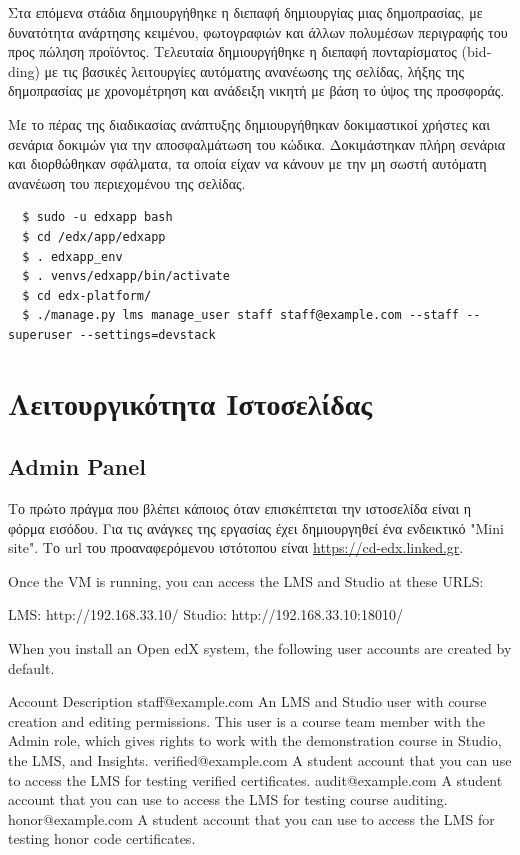 \documentclass[12pt]{report}
\begin{document}
Στα επόμενα στάδια δημιουργήθηκε η διεπαφή δημιουργίας μιας δημοπρασίας, με δυνατότητα ανάρτησης κειμένου, φωτογραφιών και άλλων πολυμέσων περιγραφής του προς πώληση προϊόντος. Τελευταία δημιουργήθηκε η διεπαφή πονταρίσματος (\textlatin{bidding}) με τις βασικές λειτουργίες αυτόματης ανανέωσης της σελίδας, λήξης της δημοπρασίας με χρονομέτρηση και ανάδειξη νικητή με βάση το ύψος της προσφοράς.

Με το πέρας της διαδικασίας ανάπτυξης δημιουργήθηκαν δοκιμαστικοί χρήστες και σενάρια δοκιμών για την αποσφαλμάτωση του κώδικα. Δοκιμάστηκαν πλήρη σενάρια και διορθώθηκαν σφάλματα, τα οποία είχαν να κάνουν με την μη σωστή αυτόματη ανανέωση του περιεχομένου της σελίδας.
\begin{Verbatim}
  $ sudo -u edxapp bash
  $ cd /edx/app/edxapp
  $ . edxapp_env
  $ . venvs/edxapp/bin/activate
  $ cd edx-platform/
  $ ./manage.py lms manage_user staff staff@example.com --staff --superuser --settings=devstack
\end{Verbatim}

\section{Λειτουργικότητα Ιστοσελίδας}
\subsection{\textlatin{Admin Panel}}
Το πρώτο πράγμα που βλέπει κάποιος όταν επισκέπτεται την ιστοσελίδα είναι η φόρμα εισόδου. Για τις ανάγκες της εργασίας έχει δημιουργηθεί ένα ενδεικτικό \textlatin{"Mini site"}. Το \textlatin{url} του προαναφερόμενου ιστότοπου είναι \textlatin{\url{https://cd-edx.linked.gr}}.

Once the VM is running, you can access the LMS and Studio at these URLS:

    LMS: http://192.168.33.10/
    Studio: http://192.168.33.10:18010/

When you install an Open edX system, the following user accounts are created by default.

    Account             Description
    staff@example.com   An LMS and Studio user with course creation and editing permissions. This user is a course team member with the Admin role, which gives rights to work with the demonstration course in Studio, the LMS, and Insights.
    verified@example.com  A student account that you can use to access the LMS for testing verified certificates.
    audit@example.com   A student account that you can use to access the LMS for testing course auditing.
    honor@example.com   A student account that you can use to access the LMS for testing honor code certificates.
\end{document}
